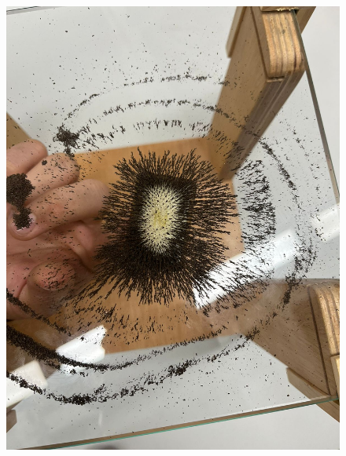 \begin{figure}[H]
  \centering
  \begin{minipage}{0.45\textwidth}
    \centering
    \includegraphics[width=\textwidth]{Figures/1. Content/LimadurasHierro3.jpeg}
    \label{fig: Limadura de Hierro 3}
  \end{minipage}
  \hfill
  \begin{minipage}{0.45\textwidth}
    \centering

\end{minipage}
\end{figure}

